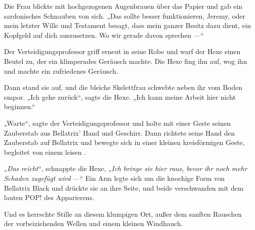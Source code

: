 Die Frau blickte mit hochgezogenen Augenbrauen über das Papier und gab ein sardonisches Schnauben von sich.
„Das sollte besser funktionieren, Jeremy, oder mein letzter Wille und Testament besagt, dass mein ganzer Besitz dazu dient, ein Kopfgeld auf dich auszusetzen. Wo wir gerade davon sprechen —“

Der Verteidigungsprofessor griff erneut in seine Robe und warf der Hexe einen Beutel zu, der ein klimperndes Geräusch machte. Die Hexe fing ihn auf, wog ihn und machte ein zufriedenes Geräusch.

Dann stand sie auf, und die bleiche Skelettfrau schwebte neben ihr vom Boden empor.
„Ich gehe zurück“, sagte die Hexe.
„Ich kann meine Arbeit hier nicht beginnen.“

„Warte“, sagte der Verteidigungsprofessor und holte mit einer Geste seinen Zauberstab aus Bellatrix’ Hand und Geschirr. Dann richtete seine Hand den Zauberstab auf Bellatrix und bewegte sich in einer kleinen kreisförmigen Geste, begleitet von einem leisen .

„\emph{Das reicht}“, schnappte die Hexe, „\emph{Ich bringe sie hier raus, bevor ihr noch mehr Schaden zugefügt wird} —“ Ein Arm legte sich um die knochige Form von Bellatrix Black und drückte sie an ihre Seite, und beide verschwanden mit dem lauten POP! des Apparierens.

Und es herrschte Stille an diesem klumpigen Ort, außer dem sanften Rauschen der vorbeiziehenden Wellen und einem kleinen Windhauch.

